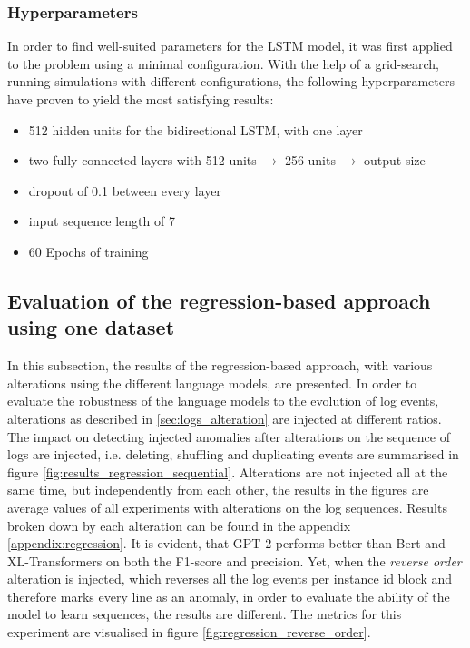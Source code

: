 \subsubsection{Hyperparameters}
In order to find well-suited parameters for the LSTM model, it was first applied to the problem using a minimal configuration. With the help of a grid-search, running simulations with different configurations, the following hyperparameters have proven to yield the most satisfying results:
\begin{itemize}
	\item 512 hidden units for the bidirectional LSTM, with one layer
	\item two fully connected layers with 512 units $\rightarrow$ 256 units $\rightarrow$ output size
	\item dropout of 0.1 between every layer
	\item input sequence length of 7
	\item 60 Epochs of training
\end{itemize}

\subsection{Evaluation of the regression-based approach using one dataset\label{sec:results-regression}}
In this subsection, the results of the regression-based approach, with various alterations using the different language models, are presented. In order to evaluate the robustness of the language models to the evolution of log events, alterations as described in \ref{sec:logs_alteration} are injected at different ratios. The impact on detecting injected anomalies after alterations on the sequence of logs are injected, i.e. deleting, shuffling and duplicating events are summarised in figure \ref{fig:results_regression_sequential}. Alterations are not injected all at the same time, but independently from each other, the results in the figures are average values of all experiments with alterations on the log sequences. Results broken down by each alteration can be found in the appendix \ref{appendix:regression}. It is evident, that GPT-2 performs better than Bert and XL-Transformers on both the F1-score and precision. Yet, when the \textit{reverse order} alteration is injected, which reverses all the log events per instance id block and therefore marks every line as an anomaly, in order to evaluate the ability of the model to learn sequences, the results are different. The metrics for this experiment are visualised in figure \ref{fig:regression_reverse_order}.

